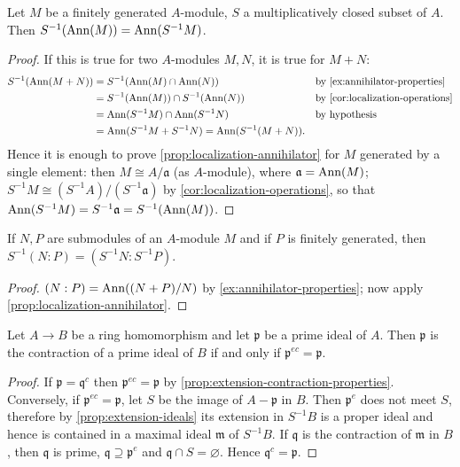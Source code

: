 \begin{proposition}\label{prop:localization-annihilator}
    Let $M$ be a finitely generated $A$-module, $S$ a multiplicatively closed subset of $A$. Then $S^{-1}(\operatorname{Ann}(M)) = \operatorname{Ann}(S^{-1}M)$.
\end{proposition}

\begin{proof}
    If this is true for two $A$-modules $M, N$, it is true for $M + N$:
    \begin{align*}
        S^{-1}(\operatorname{Ann}(M + N)) &= S^{-1}(\operatorname{Ann}(M) \cap \operatorname{Ann}(N)) && \text{by \eqref{ex:annihilator-properties}} \\
        &= S^{-1}(\operatorname{Ann}(M)) \cap S^{-1}(\operatorname{Ann}(N)) && \text{by \eqref{cor:localization-operations}} \\
        &= \operatorname{Ann}(S^{-1}M) \cap \operatorname{Ann}(S^{-1}N) && \text{by hypothesis} \\
        &= \operatorname{Ann}(S^{-1}M + S^{-1}N) = \operatorname{Ann}(S^{-1}(M + N)).
    \end{align*}
    Hence it is enough to prove \eqref{prop:localization-annihilator} for $M$ generated by a single element: then $M \cong A/\mathfrak{a}$ (as $A$-module), where $\mathfrak{a} = \operatorname{Ann}(M)$; $S^{-1}M \cong (S^{-1}A)/(S^{-1}\mathfrak{a})$ by \eqref{cor:localization-operations}, so that $\operatorname{Ann}(S^{-1}M) = S^{-1}\mathfrak{a} = S^{-1}(\operatorname{Ann}(M))$.
\end{proof}

\begin{corollary}\label{cor:localization-colon}
    If $N, P$ are submodules of an $A$-module $M$ and if $P$ is finitely generated, then $S^{-1}(N : P) = (S^{-1}N : S^{-1}P)$.
\end{corollary}

\begin{proof}
    $(N : P) = \operatorname{Ann}((N + P)/N)$ by \eqref{ex:annihilator-properties}; now apply \eqref{prop:localization-annihilator}.
\end{proof}

\begin{proposition}\label{prop:contracted-ideal}
Let $A \to B$ be a ring homomorphism and let $\mathfrak{p}$ be a prime ideal of $A$. Then $\mathfrak{p}$ is the contraction of a prime ideal of $B$ if and only if $\mathfrak{p}^{ec} = \mathfrak{p}$.
\end{proposition}

\begin{proof}
If $\mathfrak{p} = \mathfrak{q}^c$ then $\mathfrak{p}^{ec} = \mathfrak{p}$ by \eqref{prop:extension-contraction-properties}. Conversely, if $\mathfrak{p}^{ec} = \mathfrak{p}$, let $S$ be the image of $A - \mathfrak{p}$ in $B$. Then $\mathfrak{p}^e$ does not meet $S$, therefore by \eqref{prop:extension-ideals} its extension in $S^{-1}B$ is a proper ideal and hence is contained in a maximal ideal $\mathfrak{m}$ of $S^{-1}B$. If $\mathfrak{q}$ is the contraction of $\mathfrak{m}$ in $B$, then $\mathfrak{q}$ is prime, $\mathfrak{q} \supseteq \mathfrak{p}^e$ and $\mathfrak{q} \cap S = \varnothing$. Hence $\mathfrak{q}^c = \mathfrak{p}$.
\end{proof}


